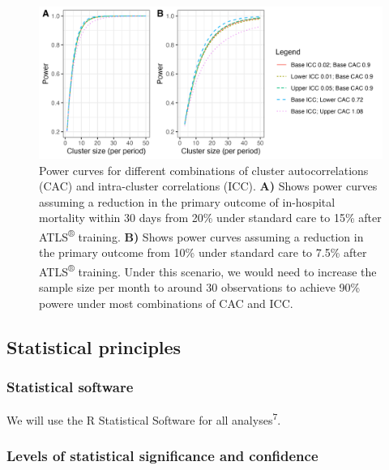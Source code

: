 \documentclass[
]{scrartcl}
\begin{document}
\begin{figure}

{\centering \includegraphics{./combined-power-curves.png}

}

\caption{\label{fig-power-curves}Power curves for different combinations
of cluster autocorrelations (CAC) and intra-cluster correlations (ICC).
\textbf{A)} Shows power curves assuming a reduction in the primary
outcome of in-hospital mortality within 30 days from 20\% under standard
care to 15\% after ATLS\textsuperscript{®} training. \textbf{B)} Shows
power curves assuming a reduction in the primary outcome from 10\% under
standard care to 7.5\% after ATLS\textsuperscript{®} training. Under
this scenario, we would need to increase the sample size per month to
around 30 observations to achieve 90\% powere under most combinations of
CAC and ICC.}

\end{figure}

\hypertarget{statistical-principles}{%
\subsection{Statistical principles}\label{statistical-principles}}

\hypertarget{statistical-software}{%
\subsubsection{Statistical software}\label{statistical-software}}

We will use the R Statistical Software for all
analyses\textsuperscript{7}.

\hypertarget{levels-of-statistical-significance-and-confidence}{%
\subsubsection{Levels of statistical significance and
confidence}\label{levels-of-statistical-significance-and-confidence}}
\end{document}
